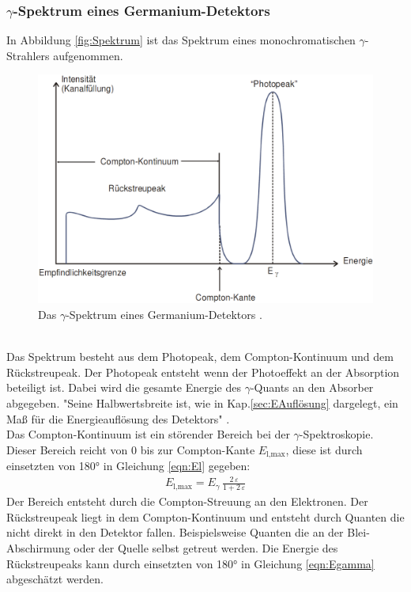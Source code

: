 \subsubsection{\texorpdfstring{$\gamma$}{}-Spektrum eines Germanium-Detektors}
In Abbildung \eqref{fig:Spektrum} ist das Spektrum eines monochromatischen $\gamma$-Strahlers aufgenommen.

\begin{figure} %
	\centering
	\includegraphics[width=0.8\linewidth]{Bilder/Spektrum.png}
	\caption{Das $\gamma$-Spektrum eines Germanium-Detektors \cite{V18}.}
	\label{fig:Spektrum}
\end{figure}
 \\
Das Spektrum besteht aus dem Photopeak, dem Compton-Kontinuum und dem Rückstreupeak. Der Photopeak entsteht wenn der Photoeffekt an der Absorption beteiligt ist. Dabei wird die gesamte Energie des $\gamma$-Quants an den Absorber abgegeben. "Seine Halbwertsbreite ist, wie in Kap.\ref{sec:EAuflösung} dargelegt, ein Maß für die Energieauflösung des Detektors" \cite[22]{V18}. \\
Das Compton-Kontinuum ist ein störender Bereich bei der $\gamma$-Spektroskopie. Dieser Bereich reicht von 0 bis zur Compton-Kante $E_\text{l,max}$, diese ist durch einsetzten von 180° in Gleichung \eqref{eqn:El} gegeben:
\begin{align}
	E_\text{l,max}= E_\gamma \, \frac{2\,\varepsilon} {1 + 2\,\varepsilon}
	\label{eqn:Comptonkante}
\end{align}
Der Bereich entsteht durch die Compton-Streuung an den Elektronen. Der Rückstreupeak liegt in dem Compton-Kontinuum und entsteht durch Quanten die nicht direkt in den Detektor fallen. Beispielsweise Quanten die an der Blei-Abschirmung oder der Quelle selbst getreut werden. Die Energie des Rückstreupeaks kann durch einsetzten von 180° in Gleichung \eqref{eqn:Egamma} abgeschätzt werden.



